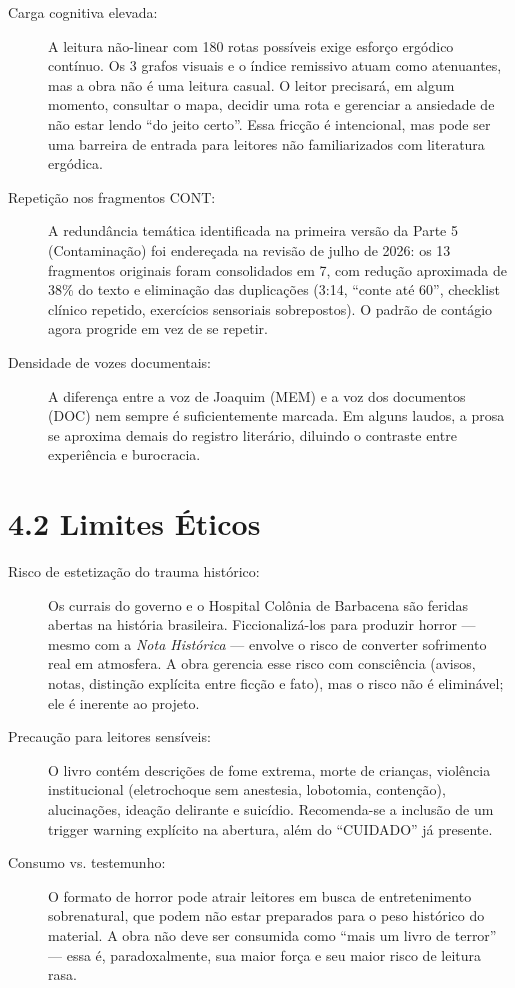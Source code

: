 \documentclass[14pt,openany]{extbook}
\begin{document}
\begin{description}
\item[Carga cognitiva elevada:] A leitura não-linear com 180 rotas possíveis exige esforço ergódico contínuo. Os 3 grafos visuais e o índice remissivo atuam como atenuantes, mas a obra não é uma leitura casual. O leitor precisará, em algum momento, consultar o mapa, decidir uma rota e gerenciar a ansiedade de não estar lendo ``do jeito certo''. Essa fricção é intencional, mas pode ser uma barreira de entrada para leitores não familiarizados com literatura ergódica.
\item[Repetição nos fragmentos CONT:] A redundância temática identificada na primeira versão da Parte 5 (Contaminação) foi endereçada na revisão de julho de 2026: os 13 fragmentos originais foram consolidados em 7, com redução aproximada de 38\% do texto e eliminação das duplicações (3:14, ``conte até 60'', checklist clínico repetido, exercícios sensoriais sobrepostos). O padrão de contágio agora progride em vez de se repetir.
\item[Densidade de vozes documentais:] A diferença entre a voz de Joaquim (MEM) e a voz dos documentos (DOC) nem sempre é suficientemente marcada. Em alguns laudos, a prosa se aproxima demais do registro literário, diluindo o contraste entre experiência e burocracia.
\end{description}

\section*{4.2 Limites Éticos}

\begin{description}
\item[Risco de estetização do trauma histórico:] Os currais do governo e o Hospital Colônia de Barbacena são feridas abertas na história brasileira. Ficcionalizá-los para produzir horror --- mesmo com a \textit{Nota Histórica} --- envolve o risco de converter sofrimento real em atmosfera. A obra gerencia esse risco com consciência (avisos, notas, distinção explícita entre ficção e fato), mas o risco não é eliminável; ele é inerente ao projeto.
\item[Precaução para leitores sensíveis:] O livro contém descrições de fome extrema, morte de crianças, violência institucional (eletrochoque sem anestesia, lobotomia, contenção), alucinações, ideação delirante e suicídio. Recomenda-se a inclusão de um trigger warning explícito na abertura, além do ``CUIDADO'' já presente.
\item[Consumo vs. testemunho:] O formato de horror pode atrair leitores em busca de entretenimento sobrenatural, que podem não estar preparados para o peso histórico do material. A obra não deve ser consumida como ``mais um livro de terror'' --- essa é, paradoxalmente, sua maior força e seu maior risco de leitura rasa.
\end{description}
\end{document}
